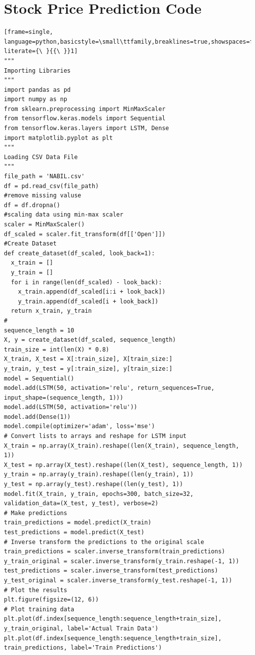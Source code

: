 \documentclass[./main.tex]{subfiles}
\begin{document}
\section*{Stock Price Prediction Code}
\begin{lstlisting}[frame=single, language=python,basicstyle=\small\ttfamily,breaklines=true,showspaces=false,columns=fullflexible, literate={\ }{{\ }}1]
"""
Importing Libraries
"""
import pandas as pd
import numpy as np
from sklearn.preprocessing import MinMaxScaler
from tensorflow.keras.models import Sequential
from tensorflow.keras.layers import LSTM, Dense
import matplotlib.pyplot as plt
""" 
Loading CSV Data File 
"""
file_path = 'NABIL.csv'
df = pd.read_csv(file_path)
#remove missing valuse 
df = df.dropna()
#scaling data using min-max scaler
scaler = MinMaxScaler()
df_scaled = scaler.fit_transform(df[['Open']])
#Create Dataset
def create_dataset(df_scaled, look_back=1):
  x_train = []
  y_train = []
  for i in range(len(df_scaled) - look_back):
    x_train.append(df_scaled[i:i + look_back])
    y_train.append(df_scaled[i + look_back])
  return x_train, y_train
#
sequence_length = 10
X, y = create_dataset(df_scaled, sequence_length)
train_size = int(len(X) * 0.8)
X_train, X_test = X[:train_size], X[train_size:]
y_train, y_test = y[:train_size], y[train_size:]
model = Sequential()
model.add(LSTM(50, activation='relu', return_sequences=True, input_shape=(sequence_length, 1)))
model.add(LSTM(50, activation='relu'))
model.add(Dense(1))
model.compile(optimizer='adam', loss='mse')
# Convert lists to arrays and reshape for LSTM input
X_train = np.array(X_train).reshape((len(X_train), sequence_length, 1))
X_test = np.array(X_test).reshape((len(X_test), sequence_length, 1))
y_train = np.array(y_train).reshape((len(y_train), 1))
y_test = np.array(y_test).reshape((len(y_test), 1))
model.fit(X_train, y_train, epochs=300, batch_size=32, validation_data=(X_test, y_test), verbose=2)
# Make predictions
train_predictions = model.predict(X_train)
test_predictions = model.predict(X_test)
# Inverse transform the predictions to the original scale
train_predictions = scaler.inverse_transform(train_predictions)
y_train_original = scaler.inverse_transform(y_train.reshape(-1, 1))
test_predictions = scaler.inverse_transform(test_predictions)
y_test_original = scaler.inverse_transform(y_test.reshape(-1, 1))
# Plot the results
plt.figure(figsize=(12, 6))
# Plot training data
plt.plot(df.index[sequence_length:sequence_length+train_size], y_train_original, label='Actual Train Data')
plt.plot(df.index[sequence_length:sequence_length+train_size], train_predictions, label='Train Predictions')

\end{lstlisting}
\end{document}
